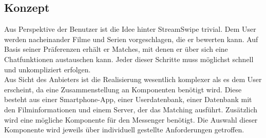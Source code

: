 \label{sec:app_concept}

\subsection{Konzept}
Aus Perspektive der Benutzer ist die Idee hinter StreamSwipe trivial. Dem User werden nacheinander Filme und Serien vorgeschlagen, die er bewerten kann. Auf Basis seiner Präferenzen erhält er Matches, mit denen er über sich eine Chatfunktionen austauschen kann. Jeder dieser Schritte muss möglichst schnell und unkompliziert erfolgen.\\
Aus Sicht des Anbieters ist die Realisierung wesentlich komplexer als es dem User erscheint, da eine Zusammenstellung an Komponenten benötigt wird.  Diese besteht aus einer Smartphone-App, einer Userdatenbank, einer Datenbank mit den Filminformationen und einem Server, der das Matching ausführt. Zusätzlich wird eine mögliche Komponente für den Messenger benötigt. Die Auswahl dieser Komponente wird jeweils über individuell gestellte Anforderungen getroffen. \\

